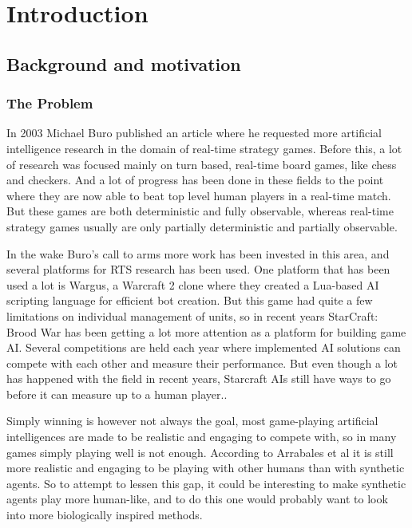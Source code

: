 
\chapter{Introduction}

\section{Background and motivation}

\subsection{The Problem}
In 2003 Michael Buro published an article where he requested more artificial
intelligence research in the domain of real-time strategy
games.\cite{buro2003real} Before this, a lot of research was focused mainly on
turn based, real-time board games, like chess and checkers. And a lot of
progress has been done in these fields to the point where they are now able to
beat top level human players in a real-time match. \cite{campbell2002deep} But
these games are both deterministic and fully observable, whereas real-time
strategy games usually are only partially deterministic and partially
observable.

In the wake Buro's call to arms more work has been invested in this area, and
several platforms for RTS research has been used. One platform that has been
used a lot is Wargus\cite{wargus}, a Warcraft 2 clone where they created a
Lua-based AI scripting language for efficient bot creation. But this game had
quite a few limitations on individual management of units, so in recent years
StarCraft: Brood War has been getting a lot more attention as a platform for
building game AI. Several competitions are held each year where implemented AI
solutions can compete with each other and measure their performance. But even
though a lot has happened with the field in recent years, Starcraft AIs still
have ways to go before it can measure up to a human player.\cite{eisbotvsfong}.

Simply winning is however not always the goal, most game-playing artificial
intelligences are made to be realistic and engaging to compete with, so in many
games simply playing well is not enough. According to Arrabales et
al \cite{arrabales2009gamechars} it is still more realistic and engaging to be
playing with other humans than with synthetic agents. So to attempt to lessen
this gap, it could be interesting to make synthetic agents play more human-like,
and to do this one would probably want to look into more biologically inspired
methods.


